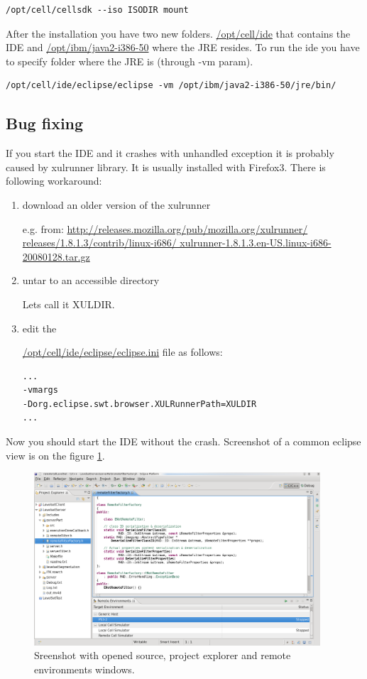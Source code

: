 \begin{verbatim}
/opt/cell/cellsdk --iso ISODIR mount
\end{verbatim}

After the installation you have two new folders.
\url{/opt/cell/ide} that contains the IDE and \url{/opt/ibm/java2-i386-50} where the JRE resides.
To run the ide you have to specify folder where the JRE is (through -vm param).

\begin{verbatim}
/opt/cell/ide/eclipse/eclipse -vm /opt/ibm/java2-i386-50/jre/bin/
\end{verbatim}

\subsection{Bug fixing}
\label{XULLFIX}

If you start the IDE and it crashes with unhandled exception it is probably caused by xulrunner library.
It is usually installed with Firefox3. There is following workaround:
\begin{enumerate}
\item download an older version of the xulrunner

e.g. from: \url{http://releases.mozilla.org/pub/mozilla.org/xulrunner/ releases/1.8.1.3/contrib/linux-i686/ xulrunner-1.8.1.3.en-US.linux-i686-20080128.tar.gz}

\item untar to an accessible directory

Lets call it XULDIR.

\item edit the

\url{/opt/cell/ide/eclipse/eclipse.ini} file as follows:
\begin{verbatim}
...
-vmargs
-Dorg.eclipse.swt.browser.XULRunnerPath=XULDIR
...
\end{verbatim}
\end{enumerate}
Now you should start the IDE without the crash.
Screenshot of a common eclipse view is on the figure \ref{fg:eclipse}.

\begin{figure}
    \centering
    \includegraphics[width=0.95\textwidth]{data/png/eclipse}
    \caption[Screenshot of standard cellide veiw]{Sreenshot with opened source, project explorer and remote environments windows.}
    \label{fg:eclipse}
\end{figure}

